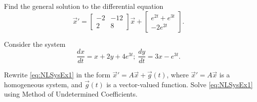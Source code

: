 \documentclass{ximera}
\begin{document}
\begin{exercise}
    Find the general solution to the differential equation
    \begin{equation*}
        {\vec{x}}' = \begin{bmatrix} -2 & -12 \\ 2 & 8 \end{bmatrix} \vec{x} + \begin{bmatrix} e^{2t} + e^{3t} \\ -2e^{2t} \end{bmatrix}. 
    \end{equation*}
\end{exercise}

\begin{exercise}
    Consider the system %
    \begin{equation}
        \frac{dx}{dt}= x+2y+4e^{3t};\ \frac{dy}{dt}=3x-e^{3t}. \label{eq:NLSysEx1}
    \end{equation}
    
    \begin{tasks}
        \task Rewrite \eqref{eq:NLSysEx1} in the form $\vec{x}'=A\vec{x}+\vec{g}(t)$, where $\vec{x}'=A\vec{x}$ is a homogeneous system, and $\vec{g}(t)$ is a vector-valued function.
        \task Solve \eqref{eq:NLSysEx1} using Method of Undetermined Coefficients.
    \end{tasks}
\end{exercise}
\end{document}
